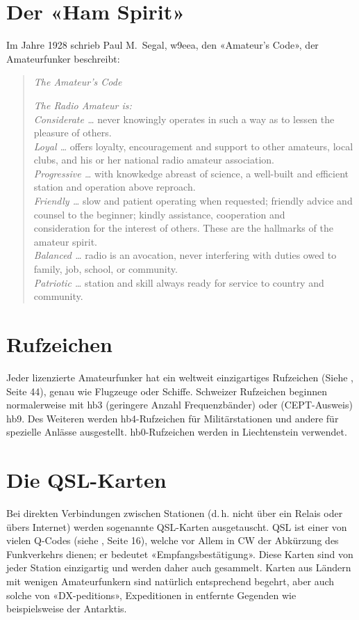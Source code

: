 \section{Der «Ham Spirit»}
Im Jahre 1928 schrieb Paul M.~Segal, w9eea, den «Amateur's Code», der Amateurfunker beschreibt:

\begin{quotation}
\textit{The Amateur's Code}

\vspace{1em}
\noindent
\textit{The Radio Amateur is:}\\
\textit{Considerate …} never knowingly operates in such a way as to lessen the pleasure of others. \\
\textit{Loyal …} offers loyalty, encouragement and support to other amateurs, local clubs, and his or her national radio amateur association. \\
\textit{Progressive …} with knowkedge abreast of science, a well-built and efficient station and operation above reproach. \\
\textit{Friendly …} slow and patient operating when requested; friendly advice and counsel to the beginner; kindly assistance, cooperation and \\ consideration for the interest of others. These are the hallmarks of the amateur spirit. \\
\textit{Balanced …} radio is an avocation, never interfering with duties owed to family, job, school, or community. \\
\textit{Patriotic …} station and skill always ready for service to country and community.
 
\end{quotation}


\section{Rufzeichen}
Jeder lizenzierte Amateurfunker hat ein weltweit einzigartiges Rufzeichen (Siehe , Seite 44), genau wie Flugzeuge oder Schiffe. Schweizer Rufzeichen beginnen normalerweise mit hb3 (geringere Anzahl Frequenzbänder) oder (CEPT-Ausweis) hb9. Des Weiteren werden hb4-Rufzeichen für Militärstationen und andere für spezielle Anlässe ausgestellt. hb0-Rufzeichen werden in Liechtenstein verwendet.

\section{Die QSL-Karten}
Bei direkten Verbindungen zwischen Stationen (d.\,h. nicht über ein Relais oder übers Internet) werden sogenannte QSL-Karten ausgetauscht. QSL ist einer von vielen Q-Codes (siehe , Seite 16), welche vor Allem in CW der Abkürzung des Funkverkehrs dienen; er bedeutet «Empfangsbestätigung». Diese Karten sind von jeder Station einzigartig und werden daher auch gesammelt. Karten aus Ländern mit wenigen Amateurfunkern sind natürlich entsprechend begehrt, aber auch solche von «DX-peditions», Expeditionen in entfernte Gegenden wie beispielsweise der Antarktis. 

